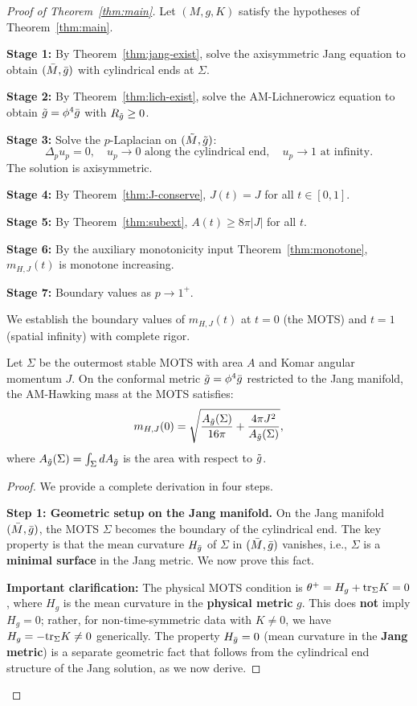 \begin{proof}[Proof of Theorem~\ref{thm:main}]
Let $(M, g, K)$ satisfy the hypotheses of Theorem~\ref{thm:main}.

\textbf{Stage 1:} By Theorem~\ref{thm:jang-exist}, solve the axisymmetric Jang equation to obtain $(\bar{M}, \bar{g})$ with cylindrical ends at $\Sigma$.

\textbf{Stage 2:} By Theorem~\ref{thm:lich-exist}, solve the AM-Lichnerowicz equation to obtain $\tilde{g} = \phi^4 \bar{g}$ with $R_{\tilde{g}} \geq 0$.

\textbf{Stage 3:} Solve the $p$-Laplacian on $(\tilde{M}, \tilde{g})$:
\[
\Delta_p u_p = 0, \quad u_p \to 0 \text{ along the cylindrical end}, \quad u_p \to 1 \text{ at infinity}.
\]
The solution is axisymmetric.

\textbf{Stage 4:} By Theorem~\ref{thm:J-conserve}, $J(t) = J$ for all $t \in [0, 1]$.

\textbf{Stage 5:} By Theorem~\ref{thm:subext}, $A(t) \geq 8\pi|J|$ for all $t$.

\textbf{Stage 6:} By the auxiliary monotonicity input Theorem~\ref{thm:monotone}, $m_{H,J}(t)$ is monotone increasing.

\textbf{Stage 7:} Boundary values as $p \to 1^+$.

We establish the boundary values of $m_{H,J}(t)$ at $t = 0$ (the MOTS) and $t = 1$ (spatial infinity) with complete rigor.

\begin{lemma}\label{lem:mots-boundary}
Let $\Sigma$ be the outermost stable MOTS with area $A$ and Komar angular momentum $J$. On the conformal metric $\tilde{g} = \phi^4\bar{g}$ restricted to the Jang manifold, the AM-Hawking mass at the MOTS satisfies:
\[
m_{H,J}(0) = \sqrt{\frac{A_{\tilde{g}}(\Sigma)}{16\pi} + \frac{4\pi J^2}{A_{\tilde{g}}(\Sigma)}},
\]
where $A_{\tilde{g}}(\Sigma) = \int_\Sigma dA_{\tilde{g}}$ is the area with respect to $\tilde{g}$.
\end{lemma}

\begin{proof}
We provide a complete derivation in four steps.

\textbf{Step 1: Geometric setup on the Jang manifold.}
On the Jang manifold $(\bar{M}, \bar{g})$, the MOTS $\Sigma$ becomes the boundary of the cylindrical end. The key property is that the mean curvature $H_{\bar{g}}$ of $\Sigma$ in $(\bar{M}, \bar{g})$ vanishes, i.e., $\Sigma$ is a \textbf{minimal surface} in the Jang metric. We now prove this fact.

\textbf{Important clarification:} The physical MOTS condition is $\theta^+ = H_g + \mathrm{tr}_\Sigma K = 0$, where $H_g$ is the mean curvature in the \textbf{physical metric} $g$. This does \textbf{not} imply $H_g = 0$; rather, for non-time-symmetric data with $K \neq 0$, we have $H_g = -\mathrm{tr}_\Sigma K \neq 0$ generically. The property $H_{\bar{g}} = 0$ (mean curvature in the \textbf{Jang metric}) is a separate geometric fact that follows from the cylindrical end structure of the Jang solution, as we now derive.


\end{proof}
\end{proof}

